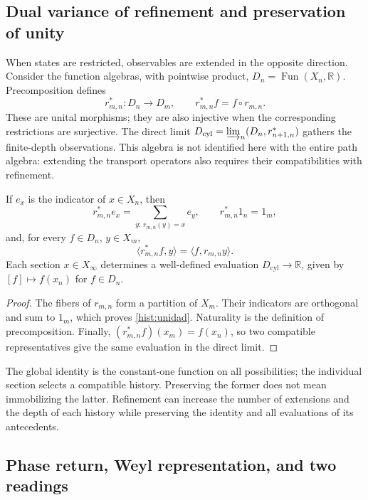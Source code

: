 \subsection{Dual variance of refinement and preservation of unity}
\label{hist:doble-varianza}

When states are restricted, observables are extended in the opposite direction.
Consider the function algebras, with pointwise product,
\(D_n=\operatorname{Fun}(X_n,\mathbb R)\). Precomposition defines
\begin{equation}
 r_{m,n}^*:D_n\longrightarrow D_m,
 \qquad r_{m,n}^*f=f\circ r_{m,n}.
 \label{hist:precomposicion}
\end{equation}
These are unital morphisms; they are also injective when the corresponding
restrictions are surjective. The direct limit
\(D_{\mathrm{cyl}}=\varinjlim_n(D_n,r_{n+1,n}^*)\) gathers the
finite-depth observations. This algebra is not identified here
with the entire path algebra: extending the transport operators also requires
their compatibilities with refinement.

\begin{lemma}
If \(e_x\) is the indicator of \(x\in X_n\), then
\begin{equation}
 r_{m,n}^*e_x=\sum_{y:\,r_{m,n}(y)=x}e_y,
 \qquad r_{m,n}^*1_n=1_m,
 \label{hist:unidad}
\end{equation}
and, for every \(f\in D_n\), \(y\in X_m\),
\[
 \langle r_{m,n}^*f,y\rangle=\langle f,r_{m,n}y\rangle.
\]
Each section \(x\in X_\infty\) determines a well-defined evaluation
\(D_{\mathrm{cyl}}\to\mathbb R\), given by \([f]\mapsto f(x_n)\)
for \(f\in D_n\).
\end{lemma}
\begin{proof}
The fibers of \(r_{m,n}\) form a partition of \(X_m\). Their
indicators are orthogonal and sum to \(1_m\), which proves
\eqref{hist:unidad}. Naturality is the definition of precomposition.
Finally, \((r_{m,n}^*f)(x_m)=f(x_n)\), so two compatible
representatives give the same evaluation in the direct limit.
\end{proof}

The global identity is the constant-one function on all possibilities;
the individual section selects a compatible history. Preserving the
former does not mean immobilizing the latter. Refinement can increase
the number of extensions and the depth of each history while preserving
the identity and all evaluations of its antecedents.

\subsection{Phase return, Weyl representation, and two readings}
\label{hist:puente-lecturas}

